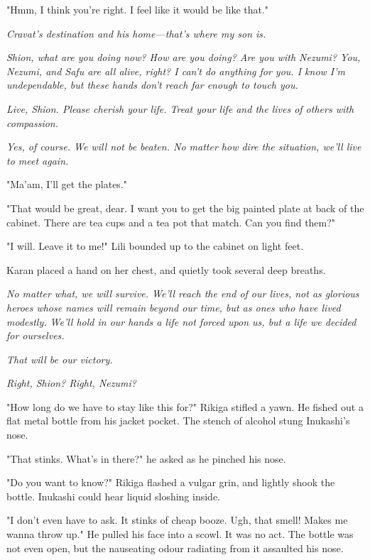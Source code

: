 "Hmm, I think you're right. I feel like it would be like that."

\emph{Cravat's destination and his home---that's where my son is.}

\emph{Shion, what are you doing now? How are you doing? Are you with Nezumi?
You, Nezumi, and Safu are all alive, right? I can't do anything for you.
I know I'm undependable, but these hands don't reach far enough to touch
you.}

\emph{Live, Shion. Please cherish your life. Treat your life and the lives of
others with compassion.}


\emph{Yes, of course. We will not be beaten. No matter how dire the situation,
we'll live to meet again.}

"Ma'am, I'll get the plates."

"That would be great, dear. I want you to get the big painted plate at
back of the cabinet. There are tea cups and a tea pot that match. Can
you find them?"

"I will. Leave it to me!" Lili bounded up to the cabinet on light feet.~

Karan placed a hand on her chest, and quietly took several deep breaths.

\emph{No matter what, we will survive. We'll reach the end of our lives, not
as glorious heroes whose names will remain beyond our time, but as ones
who have lived modestly. We'll hold in our hands a life not forced upon
us, but a life we decided for ourselves.}

\emph{That will be our victory.}

\emph{Right, Shion? Right, Nezumi?}

\mybreak

"How long do we have to stay like this for?" Rikiga stifled a yawn. He
fished out a flat metal bottle from his jacket pocket. The stench of
alcohol stung Inukashi's nose.

"That stinks. What's in there?" he asked as he pinched his nose.

"Do you want to know?" Rikiga flashed a vulgar grin, and lightly shook
the bottle. Inukashi could hear liquid sloshing inside.

"I don't even have to ask. It stinks of cheap booze. Ugh, that smell!
Makes me wanna throw up." He pulled his face into a scowl. It was no
act. The bottle was not even open, but the nauseating odour radiating
from it assaulted his nose.


